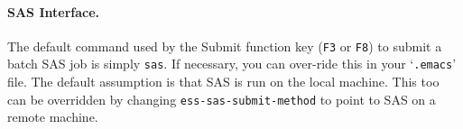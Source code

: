 \documentclass{article}
\newcommand{\stexttt}[1]{{\small\texttt{#1}}}
\newcommand{\elcode}[1]{\\{\stexttt{\hspace*{2em} #1}}\\}
\newenvironment{Salltt}{\small\begin{alltt}}{\end{alltt}}
\newcommand{\file}[1]{`\stexttt{#1}'}
\begin{document}
\paragraph{SAS Interface.}
\label{sec:SAS:interface}

The default command used by the Submit function key (\stexttt{F3} or \stexttt{F8}) to
submit a batch SAS job is simply \stexttt{sas}.  If necessary, you can
over-ride this in your \file{.emacs} file.
The default assumption is that SAS is run on the local machine.  This too
can be overridden by changing \stexttt{ess-sas-submit-method} to point to
SAS on a remote machine.



% 
% 
\end{document}
